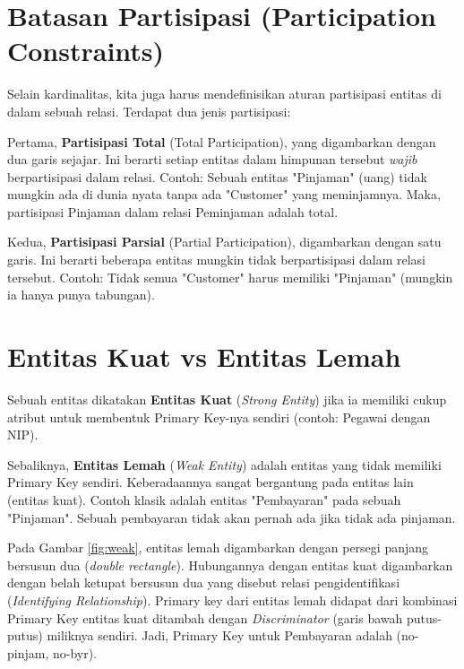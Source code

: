 \documentclass[11pt,a4paper]{article}
\begin{document}
\section{Batasan Partisipasi (Participation Constraints)}

Selain kardinalitas, kita juga harus mendefinisikan aturan partisipasi entitas di dalam sebuah relasi. Terdapat dua jenis partisipasi:

Pertama, \textbf{Partisipasi Total} (Total Participation), yang digambarkan dengan dua garis sejajar. Ini berarti setiap entitas dalam himpunan tersebut \textit{wajib} berpartisipasi dalam relasi. Contoh: Sebuah entitas "Pinjaman" (uang) tidak mungkin ada di dunia nyata tanpa ada "Customer" yang meminjamnya. Maka, partisipasi Pinjaman dalam relasi Peminjaman adalah total.

Kedua, \textbf{Partisipasi Parsial} (Partial Participation), digambarkan dengan satu garis. Ini berarti beberapa entitas mungkin tidak berpartisipasi dalam relasi tersebut. Contoh: Tidak semua "Customer" harus memiliki "Pinjaman" (mungkin ia hanya punya tabungan).

\section{Entitas Kuat vs Entitas Lemah}

Sebuah entitas dikatakan \textbf{Entitas Kuat} (\textit{Strong Entity}) jika ia memiliki cukup atribut untuk membentuk Primary Key-nya sendiri (contoh: Pegawai dengan NIP).

Sebaliknya, \textbf{Entitas Lemah} (\textit{Weak Entity}) adalah entitas yang tidak memiliki Primary Key sendiri. Keberadaannya sangat bergantung pada entitas lain (entitas kuat). Contoh klasik adalah entitas "Pembayaran" pada sebuah "Pinjaman". Sebuah pembayaran tidak akan pernah ada jika tidak ada pinjaman.

Pada Gambar \ref{fig:weak}, entitas lemah digambarkan dengan persegi panjang bersusun dua (\textit{double rectangle}). Hubungannya dengan entitas kuat digambarkan dengan belah ketupat bersusun dua yang disebut relasi pengidentifikasi (\textit{Identifying Relationship}). Primary key dari entitas lemah didapat dari kombinasi Primary Key entitas kuat ditambah dengan \textit{Discriminator} (garis bawah putus-putus) miliknya sendiri. Jadi, Primary Key untuk Pembayaran adalah (no-pinjam, no-byr).
\end{document}
